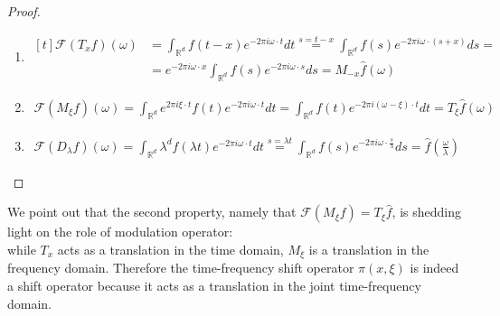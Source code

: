 \documentclass[corpo=11pt, stile=classica, tipotesi=custom,
greek, evenboxes, english]{toptesi}
\numberwithin{equation}{chapter}
\theoremstyle{remark}
\newcommand{\R}{\mathbb{R}} %
\newcommand{\F}{\mathscr{F}} %
\begin{document}
\begin{proof}
	\phantom{a}\\
	\begin{enumerate}[label=(\roman*)]
		\item $\begin{aligned}[t]
			 \F(T_xf)(\omega) &= \int_{\R^d} f(t-x) e^{-2\pi i \omega \cdot t}dt \overset{s = t-x}{=} \int_{\R^d} f(s) e^{-2\pi i \omega \cdot (s+x)}ds = \\
			                  &= e^{-2\pi i \omega \cdot x} \int_{\R^d} f(s) e^{-2\pi i \omega \cdot s}ds = M_{-x}\hat{f}(\omega) 
		\end{aligned}$
		\item $\begin{aligned}
			\F(M_\xi f)(\omega) = \int_{\R^d} e^{2 \pi i \xi \cdot t} f(t) e^{-2 \pi i \omega \cdot t}dt = \int_{\R^d} f(t) e^{-2\pi i (\omega - \xi) \cdot t} dt = T_{\xi}\hat{f}(\omega)
		\end{aligned}$
	\item $\begin{aligned}
		\F(D_{\lambda}f)(\omega) = \int_{\R^d} \lambda^d f(\lambda t) e^{-2\pi i \omega \cdot t}dt \overset{s=\lambda t}{=} \int_{\R^d} f(s) e^{-2 \pi i \omega \cdot \frac{s}{\lambda}}ds = \hat{f}\left(\frac{\omega}{\lambda}\right)
	\end{aligned}$
	\end{enumerate}	
\end{proof}
We point out that the second property, namely that $\F(M_{\xi}f) = T_{\xi}\hat{f}$, is shedding light on the role of modulation operator:\\
while $T_x$ acts as a translation in the time domain, $M_{\xi}$ is a translation in the frequency domain. Therefore the time-frequency shift operator $\pi(x,\xi)$ is indeed a shift operator because it acts as a translation in the joint time-frequency domain.
\end{document}
